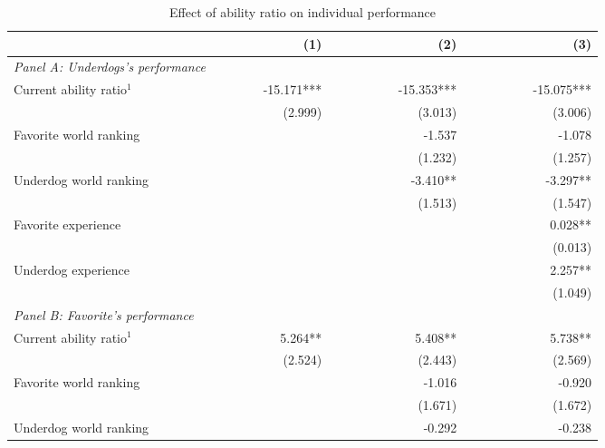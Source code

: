 \documentclass[11pt,a4paper]{article}
\begin{document}
	\begin{table}[H]
		\centering
		\caption{Effect of ability ratio on individual performance} 
		\label{tab:table_main_perf}
		\begin{tabular}{l r r r r r r } 
			\toprule \toprule
			\textbf{}                    & ~~~~~~~ & (1)    & ~~~~~~~ &  (2)   & ~~~~~~~ &  (3)         \\ 
			\midrule
            \multicolumn{7}{l}{\textit{Panel A: Underdogs's performance}} \vspace{0.7em}\\ 
			Current ability ratio$^1$ ~~~~~~~~ & & -15.171*** & & -15.353*** & & -15.075***      \\
			                               & & (2.999)    & &  (3.013)   & &  (3.006)        \\
			Favorite world ranking         & &            & &  -1.537    & &  -1.078         \\
			                               & &            & &   (1.232)  & &  (1.257)        \\
			Underdog world ranking         & &            & & -3.410**   & &  -3.297**       \\
			                               & &            & &  (1.513)   & &  (1.547)        \\
			Favorite experience            & &            & &            & &   0.028**       \\
			                               & &            & &            & &  (0.013)        \\
			Underdog experience            & &            & &            & &  2.257**        \\
			                               & &            & &            & &  (1.049)        \\
			\midrule
            \multicolumn{7}{l}{\textit{Panel B: Favorite's performance}} \vspace{0.7em} \\ 
			Current ability ratio$^1$      & & 5.264**   & &  5.408**  & &  5.738**          \\
			                               & & (2.524)   & &  (2.443)  & &  (2.569)          \\
            Favorite world ranking         & &           & &  -1.016   & &  -0.920           \\
			                               & &           & &  (1.671)  & &  (1.672)          \\
			Underdog world ranking         & &           & &  -0.292   & &  -0.238           \\

\end{tabular}
\end{table}
\end{document}
